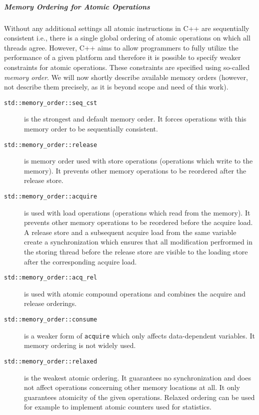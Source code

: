 \subparagraph{Memory Ordering for Atomic Operations} \label{sec:prelim:cppmemord}

Without any additional settings all atomic instructions in C++ are sequentially
consistent i.e., there is a single global ordering of atomic operations on
which all threads agree.
However, C++ aims to allow programmers to fully utilize the performance of a
given platform and therefore it is possible to specify weaker constraints for
atomic operations.
These constraints are specified using so-called \emph{memory order}.
We will now shortly describe available memory orders (however, not describe
them precisely, as it is beyond scope and need of this work).

\begin{description}
    \item[\texttt{std::memory\_order::seq\_cst}] is the strongest and default
        memory order.
        It forces operations with this memory order to be sequentially
        consistent.

        \item[\texttt{std::memory\_order::release}] is memory order used with
            store operations (operations which write to the memory).
            It prevents other memory operations to be reordered after the
            release store.

        \item[\texttt{std::memory\_order::acquire}] is used with load operations
            (operations which read from the memory).
            It prevents other memory operations to be reordered before the
            acquire load.
            A release store and a subsequent acquire load from the same variable
            create a synchronization which ensures that all modification
            perfrormed in the storing thread before the release store are
            visible to the loading store after the corresponding acquire load.

        \item[\texttt{std::memory\_order::acq\_rel}] is used with atomic
            compound operations and combines the acquire and release orderings.

        \item[\texttt{std::memory\_order::consume}] is a weaker form of
            \texttt{acquire} which only affects data-dependent variables.
            It memory ordering is not widely used.

        \item[\texttt{std::memory\_order::relaxed}] is the weakest atomic
            ordering.
            It guarantees no synchronization and does not affect operations
            concerning other memory locations at all.
            It only guarantees atomicity of the given operations.
            Relaxed ordering can be used for example to implement atomic
            counters used for statistics.
\end{description}

